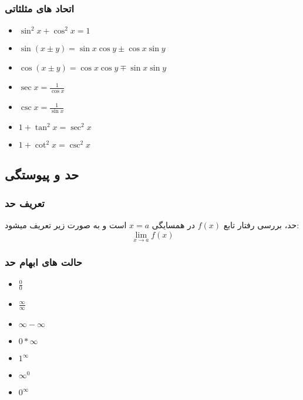 \documentclass[12pt, a4paper, oneside]{article}
\begin{document}
\subsubsection{اتحاد های مثلثاتی}
\begin{latin}
\begin{itemize}
    \item $\sin^2x + \cos^2x = 1$
    \item $\sin (x \pm y) = \sin x \cos y \pm \cos x \sin y $
    \item $\cos (x \pm y) = \cos x \cos y \mp \sin x \sin y $
    \item $\sec x= \frac{1}{\cos x}$
    \item $\csc x= \frac{1}{\sin x}$
    \item $1+\tan^2x = \sec^2x$
    \item $1+\cot^2x = \csc^2x$
\end{itemize}
\end{latin}
\subsection{حد و پیوستگی}
\subsubsection{تعریف حد}
حد، بررسی رفتار تابع $f(x)$ در همسایگی $x=a$ است و به صورت زیر تعریف میشود:
\[ \lim_{x \to a} f(x)\]
\subsubsection{حالت های ابهام حد}
\begin{latin}
\begin{itemize}
    \item $\frac{ 0 }{ 0 }$
    \item $\frac{ \infty }{ \infty }$
    \item $\infty - \infty$
    \item $0* \infty$
    \item $1^\infty$
    \item $\infty^0$
    \item $0^\infty$
\end{itemize}
\end{latin}
\end{document}
